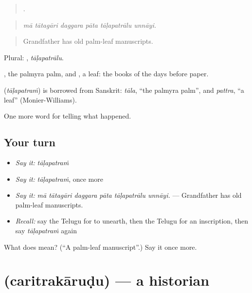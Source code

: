 \begin{quote}
     .
\end{quote}

\begin{quote}
\emph{mā tātagāri daggara pāta tāḷapatrālu unnāyi.}
\end{quote}

\begin{quote}
Grandfather has old palm-leaf manuscripts.
\end{quote}

Plural: , \emph{tāḷapatrālu}.

, the palmyra palm, and , a leaf: the books of the days before paper.

\begin{cousinweb}
\textbf{} (\emph{tāḷapatraṁ}) is borrowed from Sanskrit: \emph{tāla}, \textquotedblleft{}the palmyra palm\textquotedblright{}, and \emph{pattra}, \textquotedblleft{}a leaf\textquotedblright{} (Monier-Williams).
\end{cousinweb}

\begin{grammarlens}[title={What you've built}]
One more word for telling what happened.
\end{grammarlens}

\subsection*{Your turn}
\begin{itemize}
\raggedright
  \item \emph{Say it:} \emph{tāḷapatraṁ}
  \item \emph{Say it:} \emph{tāḷapatraṁ}, once more
  \item \emph{Say it:} \emph{mā tātagāri daggara pāta tāḷapatrālu unnāyi.} — Grandfather has old palm-leaf manuscripts.
  \item \emph{Recall:} say the Telugu for to unearth, then the Telugu for an inscription, then say \emph{tāḷapatraṁ} again
\end{itemize}

\begin{tcolorbox}[breakable,colback=teal!4,colframe=teal!35!black,title={Before you move on}]
What does  mean? (\textquotedblleft{}A palm-leaf manuscript\textquotedblright{}.) Say it once more.
\end{tcolorbox}
\section[\texorpdfstring{\te{చరిత్రకారుడు} (caritrakāruḍu)}{చరిత్రకారుడు (caritrakāruḍu)}]{ (caritrakāruḍu) — a historian}

